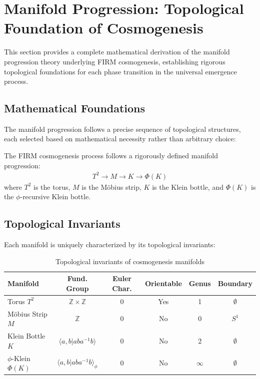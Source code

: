 \section{Manifold Progression: Topological Foundation of Cosmogenesis}\label{sec:manifold_progression}

This section provides a complete mathematical derivation of the manifold progression theory underlying FIRM cosmogenesis, establishing rigorous topological foundations for each phase transition in the universal emergence process.

\subsection{Mathematical Foundations}

The manifold progression follows a precise sequence of topological structures, each selected based on mathematical necessity rather than arbitrary choice:

\begin{definition}
The FIRM cosmogenesis process follows a rigorously defined manifold progression:
\begin{align}
T^2 \rightarrow M \rightarrow K \rightarrow \Phi(K)
\end{align}
where $T^2$ is the torus, $M$ is the Möbius strip, $K$ is the Klein bottle, and $\Phi(K)$ is the $\phi$-recursive Klein bottle.
\end{definition}

\subsection{Topological Invariants}

Each manifold is uniquely characterized by its topological invariants:

\begin{table}[H]
\centering
\begin{tabular}{|l|c|c|c|c|c|}
\hline
\textbf{Manifold} & \textbf{Fund. Group} & \textbf{Euler Char.} & \textbf{Orientable} & \textbf{Genus} & \textbf{Boundary} \\
\hline
Torus $T^2$ & $\mathbb{Z} \times \mathbb{Z}$ & 0 & Yes & 1 & $\emptyset$ \\
\hline
Möbius Strip $M$ & $\mathbb{Z}$ & 0 & No & 0 & $S^1$ \\
\hline
Klein Bottle $K$ & $\langle a,b | aba^{-1}b\rangle$ & 0 & No & 2 & $\emptyset$ \\
\hline
$\phi$-Klein $\Phi(K)$ & $\langle a,b | aba^{-1}b\rangle_{\phi}$ & 0 & No & $\infty$ & $\emptyset$ \\
\hline
\end{tabular}
\caption{Topological invariants of cosmogenesis manifolds}
\label{tab:manifold_invariants}
\end{table}

